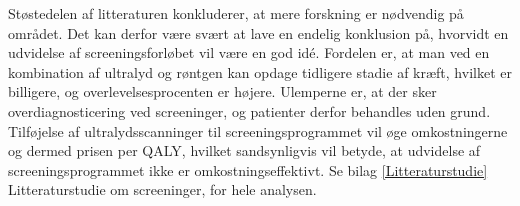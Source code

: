 Støstedelen af litteraturen konkluderer, at mere forskning er nødvendig på området. Det kan derfor være svært at lave en endelig konklusion på, hvorvidt en udvidelse af screeningsforløbet vil være en god idé. Fordelen er, at man ved en kombination af ultralyd og røntgen kan opdage tidligere stadie af kræft, hvilket er billigere, og overlevelsesprocenten er højere. Ulemperne er, at der sker overdiagnosticering ved screeninger, og patienter derfor behandles uden grund. Tilføjelse af ultralydsscanninger til screeningsprogrammet vil øge omkostningerne og dermed prisen per QALY, hvilket sandsynligvis vil betyde, at udvidelse af screeningsprogrammet ikke er omkostningseffektivt. Se bilag \ref{Litteraturstudie} Litteraturstudie om screeninger, for hele analysen. 
